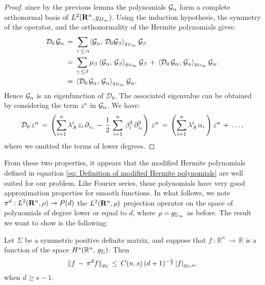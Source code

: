 \begin{proof}
    since by the previous lemma the polynomials $\mathcal G_{\alpha}$ form a
    complete orthonormal basis of $L^2(\mathbf R^n, g_{D_\infty})$.  Using the
    induction hypothesis, the symmetry of the operator, and the orthonormality
    of the Hermite polynomials gives:
    \begin{equation*}
        \begin{aligned}
            \mathcal D_0 \, \mathcal G_{\alpha}\,&=\, \sum_{\gamma\, \leq \, \alpha} \langle \mathcal
            G_{\alpha},\, \mathcal D_0 \mathcal G_{\beta}\rangle_{g_{D_\infty}}\, \mathcal G_{\beta} \\ 
            \,&=\, \sum_{\gamma\, \leq \beta} \mu_{\beta}\, \langle \mathcal G_{\alpha}, \,
            \mathcal G_{\beta}\rangle_{g_{D_\infty}}\, \mathcal G_{\beta}\,+\, \langle \mathcal D_0\,\mathcal
            G_{\alpha},\, \mathcal G_{\alpha}\rangle_{g_{D_\infty}} \, \mathcal G_{\alpha}.\\
            &= \, \langle \mathcal D_0\,\mathcal
            G_{\alpha},\, \mathcal G_{\alpha}\rangle_{g_{D_\infty}} \, \mathcal G_{\alpha}.
        \end{aligned}
    \end{equation*}
    Hence $\mathcal G_\alpha$ is an eigenfunction of $\mathcal D_0$. The associated
    eigenvalue can be obtained by considering the term $z^{\alpha}$ in
    $\mathcal G_{\alpha}$. We have: 
    $$
    \mathcal D_0\, z^{\alpha}\,=\,  \left(\sum^{n}_{i=1} \lambda_A^i \, z_i \, \partial_{z_i}  \,-\,\frac12
        \,\sum^n_{i=1} \,{\beta}_i^2\, \partial_{z_i}^2 \right)\, z^{\alpha} \,=\, \left(\sum^{n}_{i=1} \lambda_A^i \, \alpha_i \,
        \right)z^\alpha\,+\, \dots,
    $$
    where we omitted the terms of lower degrees.  
\end{proof} \fi
From these two properties, it appears that the modified Hermite polynomials
defined in equation \eqref{eq: Definition of modified Hermite polynomials} are
well suited for our problem. Like Fourier series, these polynomials have very
good approximation properties for smooth functions. In what follows, we note
$\pi^d: L^2(\mathbf R^n, \rho) \rightarrow P(d)$ the $L^2(\mathbf R^n,\rho)$ projection
operator on the space of polynomials of degree lower or equal to $d$, where
$\rho = g_{\Sigma_\infty}$ as before. The result we want to show is the
following:
\begin{proposition}
    Let $\Sigma$ be a symmetric positive definite matrix, and suppose that
    $f\,:\,\mathbb R^n\,\to\,\mathbb R$ is a function of the space $H^s(\mathbb
    R^n,\,g_{\Sigma})$. Then
    $$
        \|f\,-\,{\pi}^df\|_{g_{\Sigma}}\, \leq \,C(n,s) \, (d+1)^{-\frac{s}{2}}\, |f|_{g_{\Sigma},s},
    $$
    when $d \geq s-1$.
    \label{proposition: approx Hermite}
\end{proposition}
